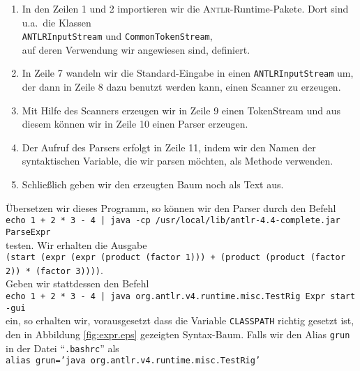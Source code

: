 \begin{enumerate}
\item In den Zeilen 1 und 2 importieren wir die \textsc{Antlr}-Runtime-Pakete.
      Dort sind u.a.~die Klassen  
      \\[0.2cm]
      \hspace*{1.3cm}
      \texttt{ANTLRInputStream} \quad und \quad \texttt{CommonTokenStream}, 
      \\[0.2cm]
      auf deren Verwendung wir angewiesen sind, definiert.
\item In Zeile 7 wandeln wir die Standard-Eingabe in einen \texttt{ANTLRInputStream} um,
      der dann in Zeile 8 dazu benutzt werden kann, einen Scanner zu erzeugen. 
\item Mit Hilfe des  Scanners erzeugen wir in Zeile 9 einen TokenStream und aus diesem k\"onnen wir 
      in Zeile 10 einen Parser erzeugen.
\item Der Aufruf des Parsers erfolgt in Zeile 11, indem wir den Namen der syntaktischen Variable,
      die wir parsen m\"ochten, als Methode verwenden.
\item Schlie{\ss}lich geben wir den erzeugten Baum noch als Text aus.
\end{enumerate}
\"Ubersetzen wir dieses Programm, so k\"onnen wir den Parser durch den Befehl
\\[0.2cm]
\hspace*{1.3cm}
\texttt{echo  1 + 2 * 3 - 4 | java -cp /usr/local/lib/antlr-4.4-complete.jar ParseExpr}
\\[0.2cm]
testen.  Wir erhalten die Ausgabe
\\[0.2cm]
\hspace*{0.3cm}
\texttt{(start (expr (expr (product (factor 1))) + (product (product (factor 2)) * (factor 3))))}.
\\[0.2cm]
Geben wir stattdessen den Befehl
\\[0.2cm]
\hspace*{1.3cm}
\texttt{echo 1 + 2 * 3 - 4 | java org.antlr.v4.runtime.misc.TestRig Expr start -gui}
\\[0.2cm]
ein, so erhalten wir, vorausgesetzt dass die Variable \texttt{CLASSPATH} richtig gesetzt ist,
den in Abbildung \ref{fig:expr.eps} gezeigten Syntax-Baum.  Falls wir den Alias \texttt{grun} in der
Datei ``\texttt{.bashrc}'' als
\\[0.2cm]
\hspace*{1.3cm}
\texttt{alias grun='java org.antlr.v4.runtime.misc.TestRig'}
\\[0.2cm]
